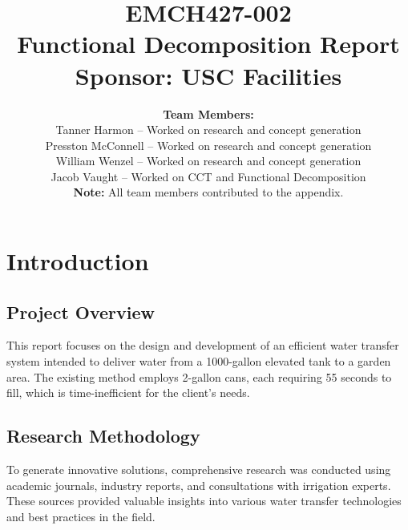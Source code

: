 \documentclass{article}
\begin{document}
\title{
    \vspace{2in}
    \textbf{EMCH427-002} \\[1ex]
    \textbf{Functional Decomposition Report} \\[1ex]
    \textbf{Sponsor: USC Facilities} \\[1ex]
    \vspace{2in}
}

\author{
    \textbf{Team Members:} \\[2ex]
    Tanner Harmon -- Worked on research and concept generation \\[1ex]
    Presston McConnell -- Worked on research and concept generation \\[1ex]
    William Wenzel -- Worked on research and concept generation \\[1ex]
    Jacob Vaught -- Worked on CCT and Functional Decomposition \\[2ex]
    \textbf{Note:} All team members contributed to the appendix.
}

\date{}

\maketitle
\thispagestyle{fancy} %

\newpage
\section{Introduction}

\subsection{Project Overview}
This report focuses on the design and development of an efficient water transfer system intended to deliver water from a 1000-gallon elevated tank to a garden area. The existing method employs 2-gallon cans, each requiring 55 seconds to fill, which is time-inefficient for the client's needs.

\subsection{Research Methodology}
To generate innovative solutions, comprehensive research was conducted using academic journals, industry reports, and consultations with irrigation experts. These sources provided valuable insights into various water transfer technologies and best practices in the field.
\end{document}
